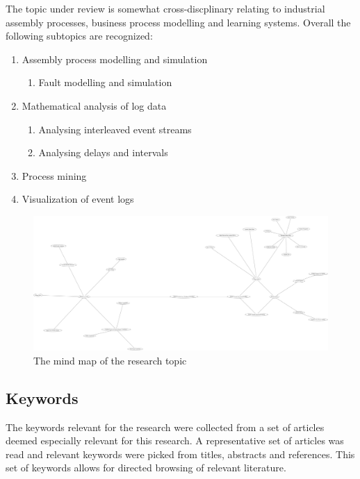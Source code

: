 \documentclass[a4paper,10pt]{article}
\begin{document}
The topic under review is somewhat cross-discplinary relating to industrial assembly processes, business process modelling and learning systems.
Overall the following subtopics are recognized:
\begin{enumerate}
 \item Assembly process modelling and simulation
   \begin{enumerate}
     \item Fault modelling and simulation
   \end{enumerate}
 \item Mathematical analysis of log data
   \begin{enumerate}
     \item Analysing interleaved event streams
     \item Analysing delays and intervals
   \end{enumerate}
 \item Process mining
 \item Visualization of event logs
\end{enumerate}

\begin{figure}[h]
\begin{center}
 \includegraphics[width=\textwidth]{./field.png}
\end{center}
\caption{The mind map of the research topic}
\end{figure} 

\subsection{Keywords}

The keywords relevant for the research were collected from a set of articles deemed especially relevant for this research. A representative set of articles was
read and relevant keywords were picked from titles, abstracts and references. This set of keywords allows for directed browsing of relevant literature.
\end{document}
